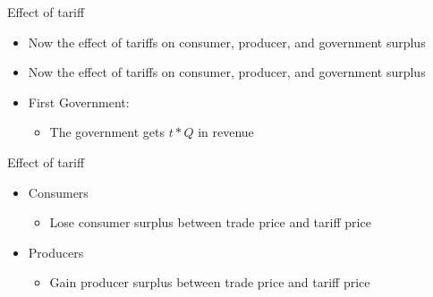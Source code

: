 \documentclass{beamer}
\begin{document}
\begin{frame}{Effect of tariff}

    \begin{itemize}
        \item Now the effect of tariffs on consumer, producer, and government surplus
        \item Now the effect of tariffs on consumer, producer, and government surplus
        \item First Government:
        \begin{itemize}
            \item The government gets $t * Q$ in revenue
        \end{itemize}
    \end{itemize}

\end{frame}


\begin{frame}{Effect of tariff}

    \begin{itemize}
        \item Consumers
        \begin{itemize}
            \item Lose consumer surplus between trade price and tariff price
        \end{itemize}
        \item Producers
        \begin{itemize}
            \item Gain producer surplus between trade price and tariff price
        \end{itemize}
    \end{itemize}

\end{frame}
\end{document}

